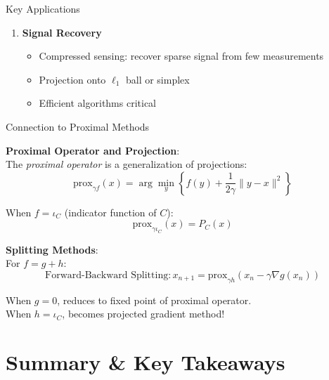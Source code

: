 \documentclass[aspectratio=169,10pt]{beamer}
\begin{document}
\begin{frame}{Key Applications}
\begin{enumerate}
        \item[\textbf{4}] \textbf{Signal Recovery}
        \begin{itemize}
            \item Compressed sensing: recover sparse signal from few measurements
            \item Projection onto $\ell_1$ ball or simplex
            \item Efficient algorithms critical
        \end{itemize}
    \end{enumerate}

\end{frame}

\begin{frame}{Connection to Proximal Methods}

    \textbf{Proximal Operator and Projection}:\\
    The \textit{proximal operator} is a generalization of projections:
    $$\text{prox}_{\gamma f}(x) = \arg\min_y \left\{ f(y) + \frac{1}{2\gamma}\|y - x\|^2 \right\}$$

    \vspace{0.3cm}

    When $f = \iota_C$ (indicator function of $C$):
    $$\text{prox}_{\gamma \iota_C}(x) = P_C(x)$$

    \vspace{0.5cm}

    \textbf{Splitting Methods}:\\
    For $f = g + h$:
    $$\text{Forward-Backward Splitting}: x_{n+1} = \text{prox}_{\gamma h}(x_n - \gamma \nabla g(x_n))$$

    When $g = 0$, reduces to fixed point of proximal operator.\\
    When $h = \iota_C$, becomes projected gradient method!

\end{frame}

\section{Summary \& Key Takeaways}
\end{document}
